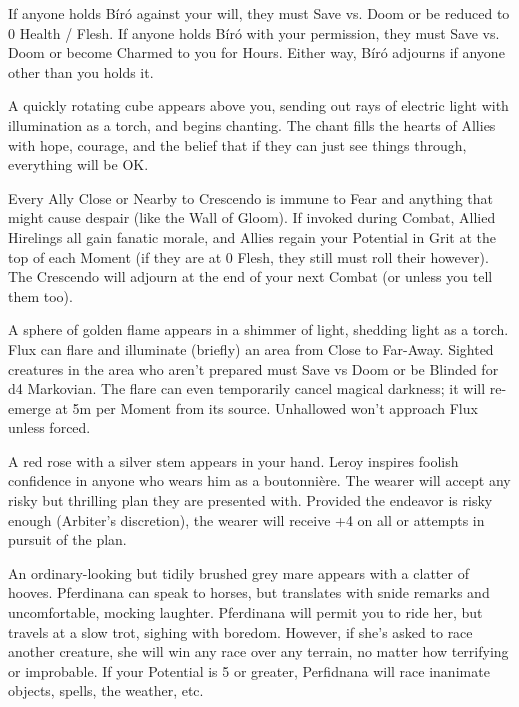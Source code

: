 If anyone holds Bíró against your will, they must Save vs.  Doom or be reduced to 0 Health / Flesh.  If anyone holds Bíró with your permission, they must Save vs. Doom or become Charmed to you for Hours.  Either way,  Bíró adjourns if anyone other than you holds it.


A quickly rotating cube appears above you, sending out rays of electric light with illumination as a torch, and begins chanting.  The chant fills the hearts of Allies with hope, courage, and the belief that if they can just see things through, everything will be OK.

Every Ally Close or Nearby to Crescendo is immune to Fear and anything that might cause despair (like the Wall of Gloom). If invoked during Combat,  Allied Hirelings all gain fanatic morale, and Allies regain your Potential in Grit at the top of each Moment (if they are at 0 Flesh, they still must roll their \DEATH however).  The Crescendo will adjourn at the end of your next Combat (or unless you tell them too).  


A sphere of golden flame appears in a shimmer of light, shedding light as a torch.  Flux can flare and illuminate (briefly) an area from Close to Far-Away.  Sighted creatures in the area who aren't prepared must Save vs Doom or be Blinded for d4 Markovian.  The flare can even temporarily cancel magical darkness; it will re-emerge at 5m per Moment from its source.  Unhallowed won't approach Flux unless forced.


A red rose with a silver stem appears in your hand.  Leroy inspires foolish confidence in anyone who wears him as a boutonnière.  The wearer will accept any risky but thrilling plan they are presented with. Provided the endeavor is risky enough (Arbiter's discretion), the wearer will receive +4 on all \RO or \RB attempts in pursuit of the plan.


An ordinary-looking but tidily brushed grey mare appears with a clatter of hooves.  Pferdinana can speak to horses, but translates with snide remarks and uncomfortable, mocking laughter.  Pferdinana will permit you to ride her, but travels at a slow trot, sighing with boredom.  However, if she's asked to race another creature, she will win any race over any terrain, no matter how terrifying or improbable.  If your Potential is 5 or greater, Perfidnana will race inanimate objects, spells, the weather, etc.

